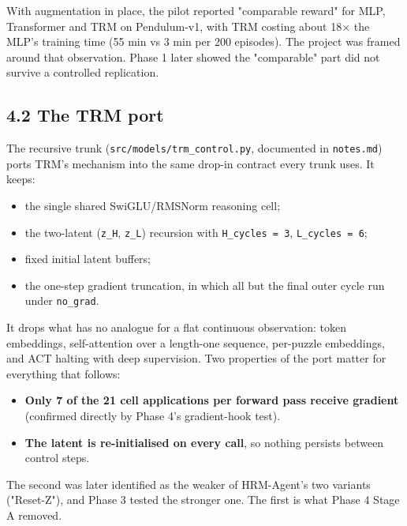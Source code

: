 \documentclass[11pt]{article}
\begin{document}
With augmentation in place, the pilot reported "comparable reward" for MLP, Transformer and TRM on Pendulum-v1, with TRM costing about 18$\times$ the MLP's training time (55 min vs 3 min per 200 episodes). The project was framed around that observation. Phase 1 later showed the "comparable" part did not survive a controlled replication.



\subsection*{4.2 The TRM port}



The recursive trunk (\texttt{src/\allowbreak{}models/\allowbreak{}trm\_\allowbreak{}control.\allowbreak{}py}, documented in \texttt{notes.md}) ports TRM's mechanism into the same drop-in contract every trunk uses. It keeps:



\begin{itemize}
\item the single shared SwiGLU/RMSNorm reasoning cell;
\item the two-latent (\texttt{z\_H}, \texttt{z\_L}) recursion with \texttt{H\_cycles = 3}, \texttt{L\_cycles = 6};
\item fixed initial latent buffers;
\item the one-step gradient truncation, in which all but the final outer cycle run under \texttt{no\_grad}.
\end{itemize}



It drops what has no analogue for a flat continuous observation: token embeddings, self-attention over a length-one sequence, per-puzzle embeddings, and ACT halting with deep supervision. Two properties of the port matter for everything that follows:



\begin{itemize}
\item \textbf{Only 7 of the 21 cell applications per forward pass receive gradient} (confirmed directly by Phase 4's gradient-hook test).
\item \textbf{The latent is re-initialised on every call}, so nothing persists between control steps.
\end{itemize}



The second was later identified as the weaker of HRM-Agent's two variants ("Reset-Z"), and Phase 3 tested the stronger one. The first is what Phase 4 Stage A removed.
\end{document}
